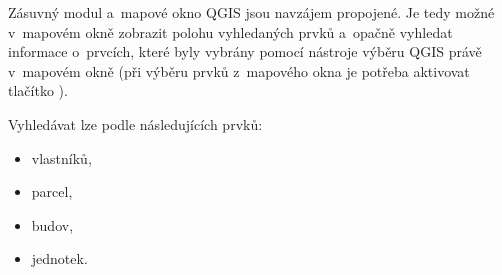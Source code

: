 \documentclass[a4paper,12pt,oneside]{book}
\begin{document}
Zásuvný modul a~mapové okno QGIS jsou navzájem propojené. Je tedy možné v~mapovém okně zobrazit polohu vyhledaných prvků a~opačně vyhledat informace o~prvcích, které byly vybrány pomocí nástroje výběru QGIS právě v~mapovém okně (při výběru prvků z~mapového okna je potřeba aktivovat tlačítko ).

Vyhledávat lze podle následujících prvků:

\begin{itemize}
 \item vlastníků,
 \item parcel,
 \item budov,
 \item jednotek.
\end{itemize}
\end{document}
